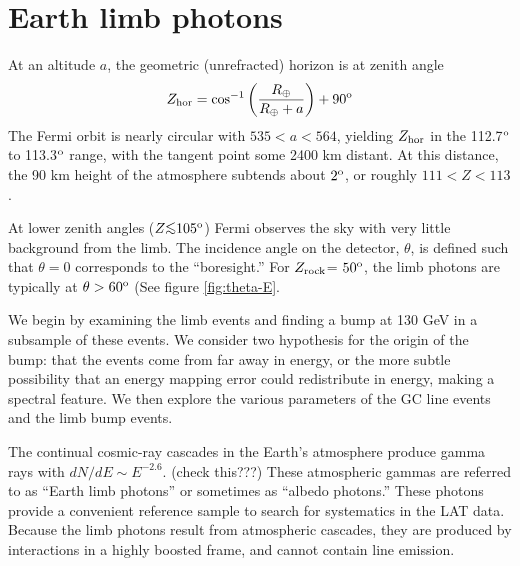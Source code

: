 \documentclass[aps,twocolumn,prd,superscriptaddress,showpacs,nofootinbib,fixfloat]{revtex4}
\newcommand{\be}{\begin{equation}}
\newcommand{\ee}{\end{equation}}
\newcommand{\degree}{^{\rm o}}
\newcommand{\zrock}{$Z_{\rm rock}$}
\def\la{\vcenter{\hbox{$<$}\offinterlineskip\hbox{$\sim$}}}
\begin{document}
\clearpage
\section{Earth limb photons}
At an altitude $a$, the geometric (unrefracted) horizon is at zenith angle
\be
Z_{\rm hor} = \cos^{-1}\left(\frac{R_\oplus}{R_\oplus+a}\right)+90\degree
\ee
The Fermi orbit is nearly circular with $535 < a < 564$, yielding $Z_{\rm
  hor}$ in the 112.7$\degree$ to 113.3$\degree$ range, with the tangent point
some 2400 km distant.  At this distance, the 90 km height of the atmosphere
subtends about $2\degree$, or roughly $111 < Z < 113$.  

At lower zenith angles ($Z \la 105\degree$) Fermi observes the sky with very
little background from the limb.  The incidence angle on the detector,
$\theta$, is defined such that $\theta=0$ corresponds to the ``boresight.''
For \zrock = $50\degree$, the limb photons are typically at $\theta >
60\degree$ (See figure \ref{fig:theta-E}.

We begin by examining the limb events and finding a bump at 130 GeV in a
subsample of these events.  We consider two hypothesis for the origin of the
bump: that the events come from far away in energy, or the more subtle
possibility that an energy mapping error could redistribute in energy, making
a spectral feature.  We then explore the various parameters of the GC line
events and the limb bump events. 

The continual cosmic-ray cascades in the Earth's atmosphere produce gamma rays
with $dN/dE \sim E^{-2.6}$.  (check this???)  These atmospheric gammas are
referred to as ``Earth limb photons'' or sometimes as ``albedo photons.''
These photons provide a convenient reference sample to search for systematics
in the LAT data.  Because the limb photons result from atmospheric cascades,
they are produced by interactions in a highly boosted frame, and cannot
contain line emission. 
\end{document}
